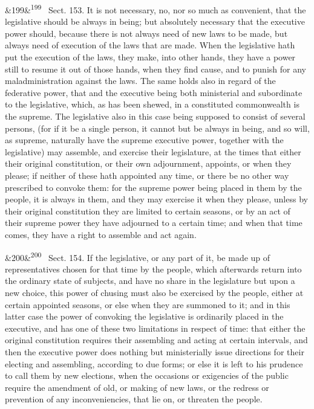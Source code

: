 \documentclass[12pt]{article}
\newcommand{\para}[1][]{\par\noindent\ifx&#1&\else\textsuperscript{\footnotesize #1}~\fi}
\begin{document}
\para[199] Sect. 153. It is not necessary, no, nor so much as convenient, that the legislative should be always in being; but absolutely necessary that the executive power should, because there is not always need of new laws to be made, but always need of execution of the laws that are made. When the legislative hath put the execution of the laws, they make, into other hands, they have a power still to resume it out of those hands, when they find cause, and to punish for any maladministration against the laws. The same holds also in regard of the federative power, that and the executive being both ministerial and subordinate to the legislative, which, as has been shewed, in a constituted commonwealth is the supreme. The legislative also in this case being supposed to consist of several persons, (for if it be a single person, it cannot but be always in being, and so will, as supreme, naturally have the supreme executive power, together with the legislative) may assemble, and exercise their legislature, at the times that either their original constitution, or their own adjournment, appoints, or when they please; if neither of these hath appointed any time, or there be no other way prescribed to convoke them: for the supreme power being placed in them by the people, it is always in them, and they may exercise it when they please, unless by their original constitution they are limited to certain seasons, or by an act of their supreme power they have adjourned to a certain time; and when that time comes, they have a right to assemble and act again.

\para[200] Sect. 154. If the legislative, or any part of it, be made up of representatives chosen for that time by the people, which afterwards return into the ordinary state of subjects, and have no share in the legislature but upon a new choice, this power of chusing must also be exercised by the people, either at certain appointed seasons, or else when they are summoned to it; and in this latter case the power of convoking the legislative is ordinarily placed in the executive, and has one of these two limitations in respect of time: that either the original constitution requires their assembling and acting at certain intervals, and then the executive power does nothing but ministerially issue directions for their electing and assembling, according to due forms; or else it is left to his prudence to call them by new elections, when the occasions or exigencies of the public require the amendment of old, or making of new laws, or the redress or prevention of any inconveniencies, that lie on, or threaten the people.
\end{document}
